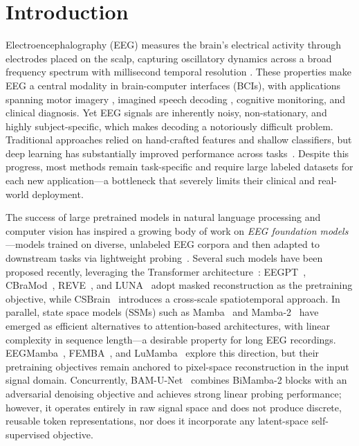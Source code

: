 \documentclass{article}
\begin{document}
\section{Introduction}

Electroencephalography (EEG) measures the brain's electrical activity through electrodes placed on the scalp, capturing oscillatory dynamics across a broad frequency spectrum with millisecond temporal resolution \citep{article, MULLERPUTZ2020249}.
These properties make EEG a central modality in brain-computer interfaces (BCIs), with applications spanning motor imagery \citep{939829}, imagined speech decoding \citep{article1}, cognitive monitoring, and clinical diagnosis.
Yet EEG signals are inherently noisy, non-stationary, and highly subject-specific, which makes decoding a notoriously difficult problem.
Traditional approaches relied on hand-crafted features and shallow classifiers, but deep learning has substantially improved performance across tasks~\citep{article0}.
Despite this progress, most methods remain task-specific and require large labeled datasets for each new application---a bottleneck that severely limits their clinical and real-world deployment.

The success of large pretrained models in natural language processing and computer vision has inspired a growing body of work on \emph{EEG foundation models}---models trained on diverse, unlabeled EEG corpora and then adapted to downstream tasks via lightweight probing~\citep{alain2017understanding}.
Several such models have been proposed recently, leveraging the Transformer architecture~\citep{NIPS2017_3f5ee243}: EEGPT~\citep{NEURIPS2024_4540d267}, CBraMod~\citep{wang2025cbramod}, REVE~\citep{ouahidi2026reve}, and LUNA~\citep{doner2025luna} adopt masked reconstruction as the pretraining objective, while CSBrain~\citep{zhou2026csbrain} introduces a cross-scale spatiotemporal approach.
In parallel, state space models (SSMs) such as Mamba~\citep{gu2024mamba} and Mamba-2~\citep{pmlr-v235-dao24a} have emerged as efficient alternatives to attention-based architectures, with linear complexity in sequence length---a desirable property for long EEG recordings.
EEGMamba~\citep{WANG2025107816}, FEMBA~\citep{DBLP:journals/corr/abs-2502-06438}, and LuMamba~\citep{unknown2} explore this direction, but their pretraining objectives remain anchored to pixel-space reconstruction in the input signal domain.
Concurrently, BAM-U-Net~\citep{bamunnet2026} combines BiMamba-2 blocks with an adversarial denoising objective and achieves strong linear probing performance; however, it operates entirely in raw signal space and does not produce discrete, reusable token representations, nor does it incorporate any latent-space self-supervised objective.
\end{document}
